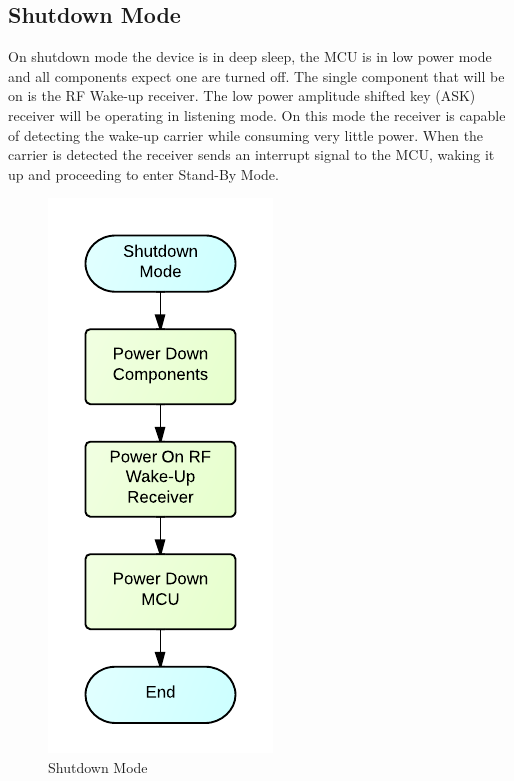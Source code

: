 \subsection{Shutdown Mode}
On shutdown mode the device is in deep sleep, the MCU is in low power mode and all components expect one are turned off. The single component that will be on is the RF Wake-up receiver. The low power amplitude shifted key (ASK) receiver will be operating in listening mode. On this mode the receiver is capable of detecting the wake-up carrier while consuming very little power. When the carrier is detected the receiver sends an interrupt signal to the MCU, waking it up and proceeding to enter Stand-By Mode.
\begin{figure}[H]
	\centering
	\includegraphics[scale=1.0]{img/ShutdownMode}
	\caption{Shutdown Mode \label{fig:shutdownMode}}
\end{figure}


